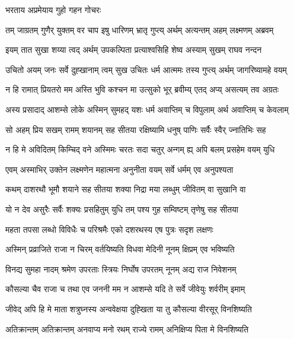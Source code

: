 
\onelineshloka
{भरताय अप्रमेयाय गुहो गहन गोचरः} %

\twolineshloka
{तम् जाग्रतम् गुणैर् युक्तम् वर चाप इषु धारिणम्}
{भ्रातृ गुप्त्य् अर्थम् अत्यन्तम् अहम् लक्ष्मणम् अब्रवम्} %

\twolineshloka
{इयम् तात सुखा शय्या त्वद् अर्थम् उपकल्पिता}
{प्रत्याश्वसिहि शेष्व अस्याम् सुखम् राघव नन्दन} %

\twolineshloka
{उचितो अयम् जनः सर्वे दुह्खानाम् त्वम् सुख उचितः}
{धर्म आत्ममः तस्य गुप्त्य् अर्थम् जागरिष्यामहे वयम्} %

\twolineshloka
{न हि रामात् प्रियतरो मम अस्ति भुवि कश्चन}
{मा उत्सुको भूर् ब्रवीम्य् एतद् अप्य् असत्यम् तव अग्रतः} %

\twolineshloka
{अस्य प्रसादाद् आशम्से लोके अस्मिन् सुमहद् यशः}
{धर्म अवाप्तिम् च विपुलाम् अर्थ अवाप्तिम् च केवलाम्} %

\twolineshloka
{सो अहम् प्रिय सखम् रामम् शयानम् सह सीतया}
{रक्षिष्यामि धनुष् पाणिः सर्वैः स्वैर् ज्नातिभिः सह} %

\twolineshloka
{न हि मे अविदितम् किम्चिद् वने अस्मिमः चरतः सदा}
{चतुर् अन्गम् ह्य् अपि बलम् प्रसहेम वयम् युधि} %

\twolineshloka
{एवम् अस्माभिर् उक्तेन लक्ष्मणेन महात्मना}
{अनुनीता वयम् सर्वे धर्मम् एव अनुपश्यता} %

\twolineshloka
{कथम् दाशरथौ भूमौ शयाने सह सीतया}
{शक्या निद्रा मया लब्धुम् जीवितम् वा सुखानि वा} %

\twolineshloka
{यो न देव असुरैः सर्वैः शक्यः प्रसहितुम् युधि}
{तम् पश्य गुह सम्विष्टम् तृणेषु सह सीतया} %

\twolineshloka
{महता तपसा लब्धो विविधैः च परिश्रमैः}
{एको दशरथस्य एष पुत्रः सदृश लक्षणः} %

\twolineshloka
{अस्मिन् प्रव्राजिते राजा न चिरम् वर्तयिष्यति}
{विधवा मेदिनी नूनम् क्षिप्रम् एव भविष्यति} %

\twolineshloka
{विनद्य सुमहा नादम् श्रमेण उपरताः स्त्रियः}
{निर्घोष उपरतम् नूनम् अद्य राज निवेशनम्} %

\twolineshloka
{कौसल्या चैव राजा च तथा एव जननी मम}
{न आशम्से यदि ते सर्वे जीवेयुः शर्वरीम् इमाम्} %

\twolineshloka
{जीवेद् अपि हि मे माता शत्रुघ्नस्य अन्ववेक्षया}
{दुह्खिता या तु कौसल्या वीरसूर् विनशिष्यति} %

\twolineshloka
{अतिक्रान्तम् अतिक्रान्तम् अनवाप्य मनो रथम्}
{राज्ये रामम् अनिक्षिप्य पिता मे विनशिष्यति} %

